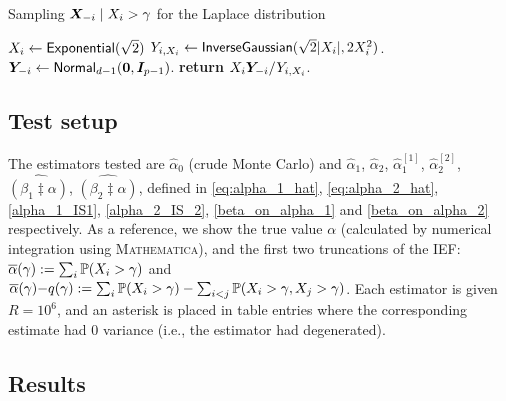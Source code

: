 \begin{algorithm}
\caption{Sampling $\bm{X}_{-i} \mid X_i > \gamma$ for the Laplace distribution}
\label{alg:cond_normals}
\begin{algorithmic}[1]
\State $X_i \gets \mathsf{Exponential}(\sqrt{2})$
\State $Y_{i,X_i} \gets \mathsf{InverseGaussian}(\sqrt{2} \lvert X_i\rvert,2 X_i^2)$.
\State $\bm{Y}_{-i} \gets \mathsf{Normal}_{d-1}(\bm{0},\bm{I}_{p-1})$.
\State \textbf{return} $X_i \bm{Y}_{-i} / Y_{i,X_i}$.
\end{algorithmic}
\end{algorithm}

\subsection{Test setup}

The estimators tested are $\hat{\alpha}_0$ (crude Monte Carlo) and
 $\hat{\alpha}_1$, $\hat{\alpha}_2$, $\hat{\alpha}_1^{[1]}$, $\hat{\alpha}_2^{[2]}$, $\widehat{(\beta_1 \ddagger \alpha)}$, $\widehat{(\beta_2 \ddagger \alpha)}$, defined in \eqref{eq:alpha_1_hat}, \eqref{eq:alpha_2_hat}, \eqref{alpha_1_IS1}, \eqref{alpha_2_IS_2}, \eqref{beta_on_alpha_1} and \eqref{beta_on_alpha_2} respectively. As a reference, we show the true value $\alpha$ (calculated by numerical integration using \textsc{Mathematica}), and the first two truncations of the IEF:
$ \overline{\alpha}(\gamma) := \sum_i \operatorname{{\mathbb P}}(X_i > \gamma)$ and $\overline{\alpha}(\gamma){-}q(\gamma) := \sum_i \operatorname{{\mathbb P}}(X_i > \gamma) - \sum_{i<j} \operatorname{{\mathbb P}}(X_i > \gamma, X_j > \gamma)$.
Each estimator is given $R=10^6$, and an asterisk is placed in table entries where the corresponding estimate had 0 variance (i.e., the estimator had degenerated).

\subsection{Results}
\enlargethispage{1cm}

